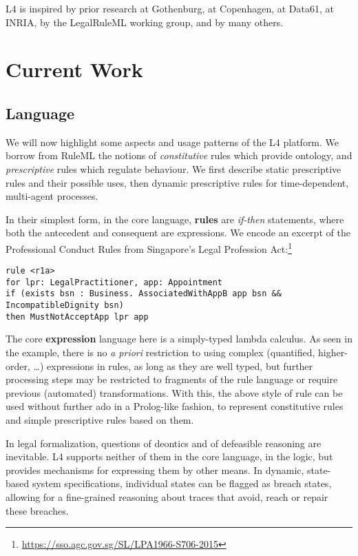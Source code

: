 \documentclass[10pt,a4paper]{article}
\begin{document}
L4 is inspired by prior research at Gothenburg, at Copenhagen, at Data61, at INRIA, by the
LegalRuleML working group, and by many others.

\section{Current Work}\label{sec:current_work}

\subsection{Language}\label{sec:language}

We will now highlight some aspects and usage patterns of the L4
platform. We borrow from RuleML the notions of \emph{constitutive} rules which provide ontology, and \emph{prescriptive} rules which regulate behaviour. We first describe static prescriptive rules and their possible uses, then dynamic prescriptive rules for time-dependent, multi-agent processes.

In their simplest form, in the core language, \textbf{rules} are \emph{if-then} statements, where both the
antecedent and consequent are expressions. We encode an
excerpt of the Professional Conduct Rules from Singapore's Legal Profession
Act:\footnote{\url{https://sso.agc.gov.sg/SL/LPA1966-S706-2015}}

\begin{lstlisting}[language=L4]
rule <r1a>
for lpr: LegalPractitioner, app: Appointment
if (exists bsn : Business. AssociatedWithAppB app bsn && IncompatibleDignity bsn)
then MustNotAcceptApp lpr app
\end{lstlisting}

\noindent The core \textbf{expression} language here is a simply-typed lambda calculus. As seen in
the example, there is no \emph{a priori} restriction to using complex
(quantified, higher-order, \dots) expressions in rules, as long as they are
well typed, but further processing steps may be restricted to fragments of the
rule language or require previous (automated) transformations. With this, the
above style of rule can be used without further ado in a Prolog-like fashion, to represent constitutive rules and simple prescriptive rules based on them.

In legal formalization, questions of deontics and of defeasible reasoning are
inevitable. L4 supports neither of them in the core language, \ie{} in the logic, but
provides mechanisms for expressing them by other means. In dynamic, state-based system
specifications, individual states can be flagged as breach states,
allowing for a fine-grained reasoning about traces that avoid, reach or repair
these breaches.
\end{document}
